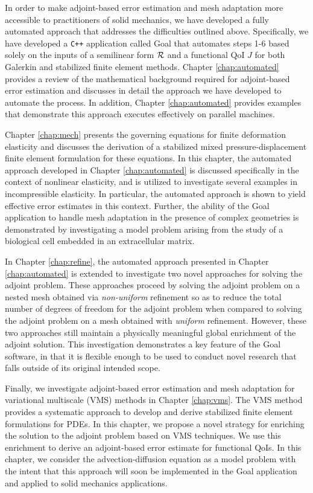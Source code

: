 In order to make adjoint-based error estimation and mesh adaptation
more accessible to practitioners of solid mechanics, we have developed
a fully automated approach that addresses the difficulties outlined
above. Specifically, we have developed a \texttt{C++} application called
Goal that automates steps 1-6 based solely on the inputs of a
semilinear form $\mathcal{R}$ and a functional QoI $J$ for both Galerkin and
stabilized finite element methods. Chapter \ref{chap:automated}
provides a review of the mathematical background required for
adjoint-based error estimation and discusses in detail the approach
we have developed to automate the process. In addition, Chapter
\ref{chap:automated} provides examples that demonstrate this approach
executes effectively on parallel machines.

Chapter \ref{chap:mech} presents the governing equations for
finite deformation elasticity and discusses the derivation
of a stabilized mixed pressure-displacement finite element
formulation for these equations. In this chapter, the automated
approach developed in Chapter \ref{chap:automated} is discussed
specifically in the context of nonlinear elasticity, and is utilized
to investigate several examples in incompressible elasticity.
In particular, the automated approach is shown to yield
effective error estimates in this context. Further, the ability of the
Goal application to handle mesh adaptation in the presence of complex
geometries is demonstrated by investigating a model problem arising
from the study of a biological cell embedded in an extracellular
matrix.

In Chapter \ref{chap:refine}, the automated approach presented in
Chapter \ref{chap:automated} is extended to investigate two
novel approaches for solving the adjoint problem.
These approaches proceed by solving the adjoint problem on a
nested mesh obtained via \emph{non-uniform} refinement so as to
reduce the total number of degrees of freedom for the adjoint problem
when compared to solving the adjoint problem on a mesh obtained
with \emph{uniform} refinement. However, these two approaches still
maintain a physically meaningful global enrichment of the adjoint
solution. This investigation demonstrates a key feature of the Goal
software, in that it is flexible enough to be used to conduct novel
research that falls outside of its original intended scope.

Finally, we investigate adjoint-based error estimation and mesh
adaptation for variational multiscale (VMS) methods in Chapter \ref{chap:vms}.
The VMS method provides a systematic approach to develop and derive
stabilized finite element formulations for PDEs. In this chapter,
we propose a novel strategy for enriching the solution to the
adjoint problem based on VMS techniques. We use this enrichment to
derive an adjoint-based error estimate for functional QoIs.
In this chapter, we consider the advection-diffusion equation as a
model problem with the intent that this approach will soon
be implemented in the Goal application and applied to
solid mechanics applications.

